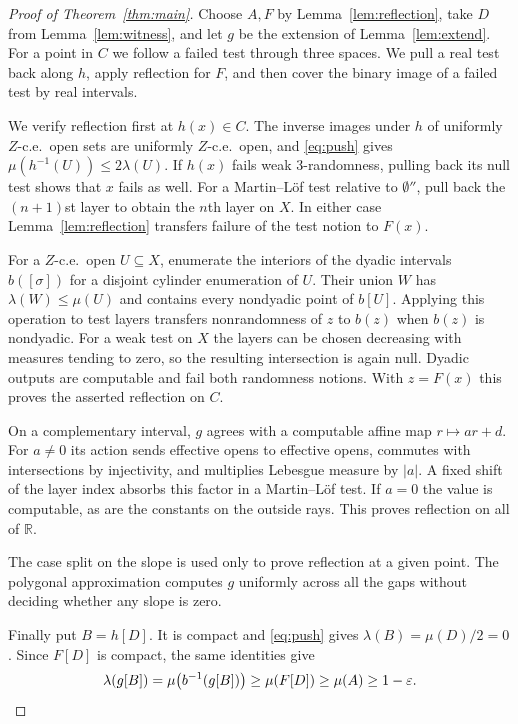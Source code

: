 \documentclass[12pt,reqno]{amsart}
\newcommand{\RR}{\mathbb R}
\newcommand{\mass}{\mu}
\newcommand{\lebesgue}{\lambda}
\newcommand{\eps}{\varepsilon}
\newcommand{\djump}{\emptyset''}
\begin{document}
\begin{proof}[Proof of Theorem~\ref{thm:main}]
Choose $A,F$ by Lemma~\ref{lem:reflection}, take $D$ from
Lemma~\ref{lem:witness}, and let $g$ be the extension of
Lemma~\ref{lem:extend}. For a point in $C$ we follow a failed test
through three spaces. We pull a real test back along $h$, apply
reflection for $F$, and then cover the binary image of a failed test
by real intervals.

We verify reflection first at $h(x)\in C$. The inverse images under $h$
of uniformly $Z$-c.e.\ open sets are uniformly $Z$-c.e.\ open, and
\eqref{eq:push} gives $\mass(h^{-1}(U))\le2\lebesgue(U)$. If $h(x)$
fails weak 3-randomness, pulling back its null test shows that $x$ fails
as well. For a Martin--L\"of test relative to $\djump$, pull back the
$(n+1)$st layer to obtain the $n$th layer on $X$. In either case
Lemma~\ref{lem:reflection} transfers failure of the test notion to $F(x)$.

For a $Z$-c.e.\ open $U\subseteq X$, enumerate the interiors of the
dyadic intervals $b([\sigma])$ for a disjoint cylinder enumeration of
$U$. Their union $W$ has $\lebesgue(W)\le\mass(U)$ and contains every
nondyadic point of $b[U]$. Applying this operation to test layers
transfers nonrandomness of $z$ to $b(z)$ when $b(z)$ is nondyadic.
For a weak test on $X$ the layers can be chosen decreasing with measures
tending to zero, so the resulting intersection is again null. Dyadic
outputs are computable and fail both randomness notions. With $z=F(x)$
this proves the asserted reflection on $C$.

On a complementary interval, $g$ agrees with a computable affine map
$r\mapsto ar+d$. For $a\ne0$ its action sends effective opens to effective
opens, commutes with intersections by injectivity, and multiplies Lebesgue
measure by $|a|$. A fixed shift of the layer index absorbs this factor in
a Martin--L\"of test. If $a=0$ the value is computable, as are the
constants on the outside rays. This proves reflection on all of $\RR$.

The case split on the slope is used only to prove reflection at a
given point. The polygonal approximation computes $g$ uniformly across
all the gaps without deciding whether any slope is zero.

Finally put $B=h[D]$. It is compact and \eqref{eq:push} gives
$\lebesgue(B)=\mass(D)/2=0$. Since $F[D]$ is compact, the same identities
give
\[
   \lebesgue(g[B])
   =\mass\bigl(b^{-1}(g[B])\bigr)
   \ge\mass(F[D])\ge\mass(A)\ge1-\eps . \qedhere
\]
\end{proof}
\end{document}
